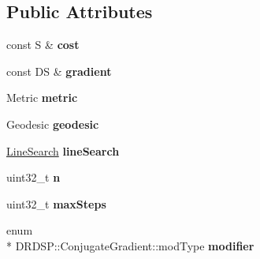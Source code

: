 \subsection*{Public Attributes}
\begin{DoxyCompactItemize}
\item 
\hypertarget{struct_d_r_d_s_p_1_1_conjugate_gradient_a99a26cfd777d03fa23e9f3b8616ab43d}{const S \& {\bfseries cost}}\label{struct_d_r_d_s_p_1_1_conjugate_gradient_a99a26cfd777d03fa23e9f3b8616ab43d}

\item 
\hypertarget{struct_d_r_d_s_p_1_1_conjugate_gradient_a7ef242a4984a63fd30f9b91df600dc6f}{const D\-S \& {\bfseries gradient}}\label{struct_d_r_d_s_p_1_1_conjugate_gradient_a7ef242a4984a63fd30f9b91df600dc6f}

\item 
\hypertarget{struct_d_r_d_s_p_1_1_conjugate_gradient_adeba6039246c2eb8d402e7621b82a849}{Metric {\bfseries metric}}\label{struct_d_r_d_s_p_1_1_conjugate_gradient_adeba6039246c2eb8d402e7621b82a849}

\item 
\hypertarget{struct_d_r_d_s_p_1_1_conjugate_gradient_a00375a585abf769b0c891db71d899234}{Geodesic {\bfseries geodesic}}\label{struct_d_r_d_s_p_1_1_conjugate_gradient_a00375a585abf769b0c891db71d899234}

\item 
\hypertarget{struct_d_r_d_s_p_1_1_conjugate_gradient_a43bb6232fc92c3aff4c848aed6ddd7fc}{\hyperlink{struct_d_r_d_s_p_1_1_line_search}{Line\-Search} {\bfseries line\-Search}}\label{struct_d_r_d_s_p_1_1_conjugate_gradient_a43bb6232fc92c3aff4c848aed6ddd7fc}

\item 
\hypertarget{struct_d_r_d_s_p_1_1_conjugate_gradient_aab99791cf6d68a73446914fdf7297fcb}{uint32\-\_\-t {\bfseries n}}\label{struct_d_r_d_s_p_1_1_conjugate_gradient_aab99791cf6d68a73446914fdf7297fcb}

\item 
\hypertarget{struct_d_r_d_s_p_1_1_conjugate_gradient_a8580aa724477135eef128de805b10935}{uint32\-\_\-t {\bfseries max\-Steps}}\label{struct_d_r_d_s_p_1_1_conjugate_gradient_a8580aa724477135eef128de805b10935}

\item 
\hypertarget{struct_d_r_d_s_p_1_1_conjugate_gradient_a2a7cb6153f1fb58b6a71f353ac1d3e9f}{enum \\*
D\-R\-D\-S\-P\-::\-Conjugate\-Gradient\-::mod\-Type {\bfseries modifier}}\label{struct_d_r_d_s_p_1_1_conjugate_gradient_a2a7cb6153f1fb58b6a71f353ac1d3e9f}

\end{DoxyCompactItemize}
